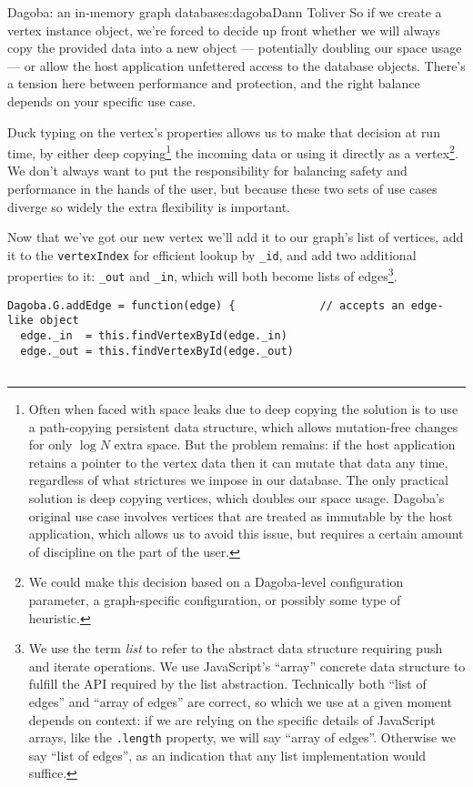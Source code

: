 \begin{aosachapter}{Dagoba: an in-memory graph database}{s:dagoba}{Dann Toliver}
So if we create a vertex instance object, we're forced to decide up
front whether we will always copy the provided data into a new object
--- potentially doubling our space usage --- or allow the host
application unfettered access to the database objects. There's a tension
here between performance and protection, and the right balance depends
on your specific use case.

Duck typing on the vertex's properties allows us to make that decision
at run time, by either deep copying\footnote{Often when faced with space
  leaks due to deep copying the solution is to use a path-copying
  persistent data structure, which allows mutation-free changes for only
  $\log{}N$ extra space. But the problem remains: if the host
  application retains a pointer to the vertex data then it can mutate
  that data any time, regardless of what strictures we impose in our
  database. The only practical solution is deep copying vertices, which
  doubles our space usage. Dagoba's original use case involves vertices
  that are treated as immutable by the host application, which allows us
  to avoid this issue, but requires a certain amount of discipline on
  the part of the user.} the incoming data or using it directly as a
vertex\footnote{We could make this decision based on a Dagoba-level
  configuration parameter, a graph-specific configuration, or possibly
  some type of heuristic.}. We don't always want to put the
responsibility for balancing safety and performance in the hands of the
user, but because these two sets of use cases diverge so widely the
extra flexibility is important.

Now that we've got our new vertex we'll add it to our graph's list of
vertices, add it to the \texttt{vertexIndex} for efficient lookup by
\texttt{\_id}, and add two additional properties to it: \texttt{\_out}
and \texttt{\_in}, which will both become lists of edges\footnote{We use
  the term \emph{list} to refer to the abstract data structure requiring
  push and iterate operations. We use JavaScript's ``array'' concrete
  data structure to fulfill the API required by the list abstraction.
  Technically both ``list of edges'' and ``array of edges'' are correct,
  so which we use at a given moment depends on context: if we are
  relying on the specific details of JavaScript arrays, like the
  \texttt{.length} property, we will say ``array of edges''. Otherwise
  we say ``list of edges'', as an indication that any list
  implementation would suffice.}.

\begin{verbatim}
Dagoba.G.addEdge = function(edge) {             // accepts an edge-like object
  edge._in  = this.findVertexById(edge._in)
  edge._out = this.findVertexById(edge._out)


\end{verbatim}
\end{aosachapter}
